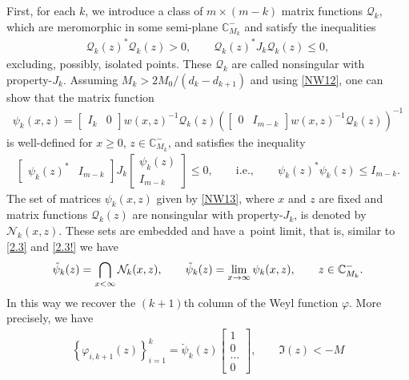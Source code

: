 \documentclass[pdftex]{sigma}
\def\BC{{\mathbb C}}
\newcommand{\cN}{{\mathcal N}}
\newcommand{\cQ}{{\mathcal Q}}
\numberwithin{equation}{section}
\begin{document}
First, for each $ k $, we introduce a class of
$m \times (m-k)$ matrix functions $\cQ_k$, which are meromorphic in some semi-plane $\BC^{-}_{M_k}$ and satisfy the inequalities
\begin{gather}
\cQ_k (z)^*
  \cQ_k(z)
 > 0, \qquad
  \cQ_k (z)^*
  J_k
  \cQ_k (z)
\leq 0,
 \label{NW12}
\end{gather}
excluding, possibly, isolated points. These $\cQ_k$ are called nonsingular with property-$J_k$.
Assu\-ming $M_k>2M_0/(d_k-d_{k+1})$ and using \eqref{NW12}, one can show that the matrix function
\begin{gather}
  \psi_k (x,z)
= \begin{bmatrix}I_k &0 \end{bmatrix}
 w (x,z)^{-1}
 \cQ_k (z)
 \left(
  \begin{bmatrix}0 &I_{m-k} \end{bmatrix}
  w (x,z)^{-1}
  \cQ_k(z)
 \right)^{-1}
 \label{NW13}
\end{gather}
is well-def\/ined for $x \geq 0$, $z \in \BC^{-}_{M_k}$, and satisf\/ies the inequality
\begin{gather}
\begin{bmatrix} \psi_k (z)^* &I_{m-k} \end{bmatrix}
 J_k
 \left[
  \begin{matrix}
    \psi_k (z) \\
    I_{m-k}
  \end{matrix}
 \right]
\leq 0 , \qquad {\mathrm{i.e.,}} \qquad \psi_k (z)^*
  \psi_k (z)
\leq I_{m-k} .
 \label{NW14}
\end{gather}
The set of matrices $\psi_k(x,z)$ given by \eqref{NW13}, where $x$ and $z$ are f\/ixed and matrix functions $\cQ_k(z)$ are nonsingular with property-$J_k$, is denoted
by $\cN_k(x,z)$. These sets are embedded and have a~point limit, that is, similar to \eqref{2.3} and \eqref{2.3!} we have
 \begin{gather}
  \breve \psi_k(z) = \bigcap\limits_{x < \infty}
           {\cal N}_k (x,z), \qquad \breve \psi_k(z)=\lim_{x\to \infty} \psi_k(x,z),
\qquad
  z \in \BC_{M_k}^{-} .
 \label{NW15}
\end{gather}
In this way we recover the $(k+1)$th column of the Weyl function $\varphi$. More precisely, we have
\begin{gather}
  \left\{
   \varphi_{i, k+1}(z)
  \right\}_{i=1}^k
 = \breve \psi_k (z)\begin{bmatrix} 1\\ 0 \\ \ldots \\0
 \end{bmatrix}, \qquad \Im(z)<-M \label{NW16}
\end{gather}
\end{document}
